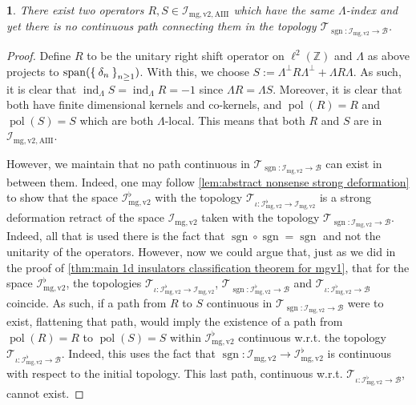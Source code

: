 \documentclass[a4paper,10pt]{article}
\numberwithin{equation}{section}
\theoremstyle{plain}
\theoremstyle{plain}
\theoremstyle{plain}
\theoremstyle{plain}
\theoremstyle{plain}
\theoremstyle{remark}
\theoremstyle{definition}
\theoremstyle{plain}
\newtheorem{example}[thm]{\protect\examplename}
\providecommand{\examplename}{Example}
\newcommand{\ZZ}{\mathbb{Z}}
\newcommand{\calB}{\mathcal{B}}
\newcommand{\calI}{\mathcal{I}}
\newcommand{\bbLambda}{\mathbb{\Lambda}}
\newcommand{\szpan}{\operatorname{span}}
\newcommand{\sgn}{\operatorname{sgn}}
\newcommand{\findex}{\operatorname{ind}}
\newcommand{\polar}{\operatorname{pol}}
\newcommand{\calT}{\mathcal{T}}
\begin{document}
	\begin{example}
		There exist two operators $R,S\in\calI_{\mathrm{mg,v2},\mathrm{AIII}}$ which have the same $\Lambda$-index and yet there is no continuous path connecting them in the topology $\calT_{\sgn:\calI_{\mathrm{mg,v2}}\to\calB}$.
	\end{example}
	\begin{proof}
		Define $R$ to be the unitary right shift operator on $\ell^2(\ZZ)$ and $\Lambda$ as above projects to $\szpan(\Set{\delta_n}_{n\geq1})$. With this, we choose $S := \Lambda^\perp R \Lambda^\perp + \Lambda R \Lambda$. As such, it is clear that $\findex_\Lambda S = \findex_\Lambda R = -1$ since $\bbLambda R = \bbLambda S$. Moreover, it is clear that both have finite dimensional kernels and co-kernels, and $\polar(R)=R$ and $\polar(S)=S$ which are both $\Lambda$-local. This means that both $R$ and $S$ are in $\calI_{\mathrm{mg,v2},\mathrm{AIII}}$.
		
		However, we maintain that no path continuous in $\calT_{\sgn:\calI_{\mathrm{mg,v2}}\to\calB}$ can exist in between them. Indeed, one may follow \cref{lem:abstract nonsense strong deformation} to show that the space $\calI^\flat_{\mathrm{mg,v2}}$ with the topology $\calT_{\iota:\calI^\flat_{\mathrm{mg,v2}}\to\calI_{\mathrm{mg,v2}}}$ is a strong deformation retract of the space $\calI_{\mathrm{mg,v2}}$ taken with the topology $\calT_{\sgn:\calI_{\mathrm{mg,v2}}\to\calB}$. Indeed, all that is used there is the fact that $\sgn\circ\sgn=\sgn$ and not the unitarity of the operators. However, now we could argue that, just as we did in the proof of \cref{thm:main 1d insulators classification theorem for mgv1}, that for the space $\calI^\flat_{\mathrm{mg,v2}}$, the topologies $\calT_{\iota:\calI^\flat_{\mathrm{mg,v2}}\to\calI_{\mathrm{mg,v2}}}$, $\calT_{\sgn:\calI^\flat_{\mathrm{mg,v2}}\to\calB}$ and $\calT_{\iota:\calI^\flat_{\mathrm{mg,v2}}\to\calB}$ coincide. As such, if a path from $R$ to $S$ continuous in $\calT_{\sgn:\calI_{\mathrm{mg,v2}}\to\calB}$ were to exist, flattening that path, would imply the existence of a path from $\polar(R)=R$ to $\polar(S)=S$ within $\calI^\flat_{\mathrm{mg,v2}}$ continuous w.r.t. the topology $\calT_{\iota:\calI^\flat_{\mathrm{mg,v2}}\to\calB}$. Indeed, this uses the fact that $\sgn:\calI_{\mathrm{mg,v2}}\to\calI_{\mathrm{mg,v2}}^\flat$ is continuous with respect to the initial topology. This last path, continuous w.r.t. $\calT_{\iota:\calI^\flat_{\mathrm{mg,v2}}\to\calB}$, cannot exist.
		

\end{proof}
\end{document}

